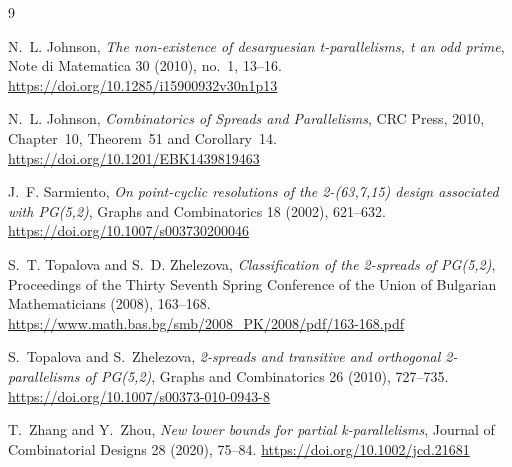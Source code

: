 \documentclass[11pt]{article}
\begin{document}
\begin{thebibliography}{9}

N.~L. Johnson,
\emph{The non-existence of desarguesian t-parallelisms, t an odd prime},
Note di Matematica 30 (2010), no.~1, 13--16.
\url{https://doi.org/10.1285/i15900932v30n1p13}

N.~L. Johnson,
\emph{Combinatorics of Spreads and Parallelisms},
CRC Press, 2010, Chapter~10, Theorem~51 and Corollary~14.
\url{https://doi.org/10.1201/EBK1439819463}

J.~F. Sarmiento,
\emph{On point-cyclic resolutions of the 2-(63,7,15) design associated with
PG(5,2)},
Graphs and Combinatorics 18 (2002), 621--632.
\url{https://doi.org/10.1007/s003730200046}

S.~T. Topalova and S.~D. Zhelezova,
\emph{Classification of the 2-spreads of PG(5,2)},
Proceedings of the Thirty Seventh Spring Conference of the Union of Bulgarian
Mathematicians (2008), 163--168.
\url{https://www.math.bas.bg/smb/2008_PK/2008/pdf/163-168.pdf}

S.~Topalova and S.~Zhelezova,
\emph{2-spreads and transitive and orthogonal 2-parallelisms of PG(5,2)},
Graphs and Combinatorics 26 (2010), 727--735.
\url{https://doi.org/10.1007/s00373-010-0943-8}

T.~Zhang and Y.~Zhou,
\emph{New lower bounds for partial k-parallelisms},
Journal of Combinatorial Designs 28 (2020), 75--84.
\url{https://doi.org/10.1002/jcd.21681}

\end{thebibliography}
\end{document}
